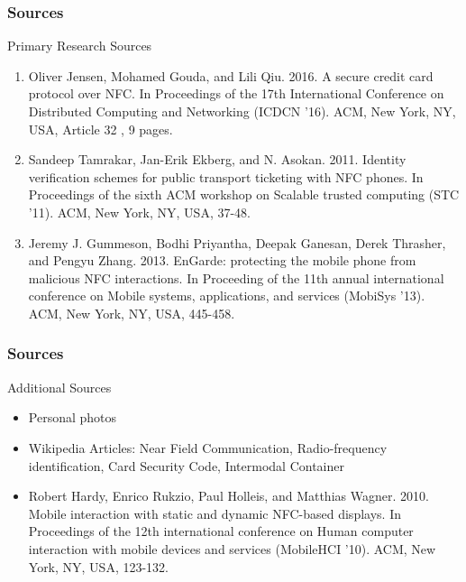 \documentclass[unknownkeysallowed]{beamer}
\begin{document}
\begin{frame}
  \frametitle{Sources}
  \begin{block}{Primary Research Sources}
    \begin{enumerate}
      \item{Oliver Jensen, Mohamed Gouda, and Lili Qiu. 2016. A secure credit card protocol over NFC. In Proceedings of the 17th International Conference on Distributed Computing and Networking (ICDCN '16). ACM, New York, NY, USA, Article 32 , 9 pages. %
      }
      \item{Sandeep Tamrakar, Jan-Erik Ekberg, and N. Asokan. 2011. Identity verification schemes for public transport ticketing with NFC phones. In Proceedings of the sixth ACM workshop on Scalable trusted computing (STC '11). ACM, New York, NY, USA, 37-48. %
      }
      \item{Jeremy J. Gummeson, Bodhi Priyantha, Deepak Ganesan, Derek Thrasher, and Pengyu Zhang. 2013. EnGarde: protecting the mobile phone from malicious NFC interactions. In Proceeding of the 11th annual international conference on Mobile systems, applications, and services (MobiSys '13). ACM, New York, NY, USA, 445-458. %
      }
    \end{enumerate}
  \end{block}
\end{frame}

\begin{frame}
  \frametitle{Sources}
  \begin{block}{Additional Sources}
    \begin{itemize}
      \item{Personal photos
      }
      \item{Wikipedia Articles: Near Field Communication, Radio-frequency identification, Card Security Code, Intermodal Container}
      \item{Robert Hardy, Enrico Rukzio, Paul Holleis, and Matthias Wagner. 2010. Mobile interaction with static and dynamic NFC-based displays. In Proceedings of the 12th international conference on Human computer interaction with mobile devices and services (MobileHCI '10). ACM, New York, NY, USA, 123-132. %
      }
    \end{itemize}
  \end{block}
\end{frame}
\end{document}
